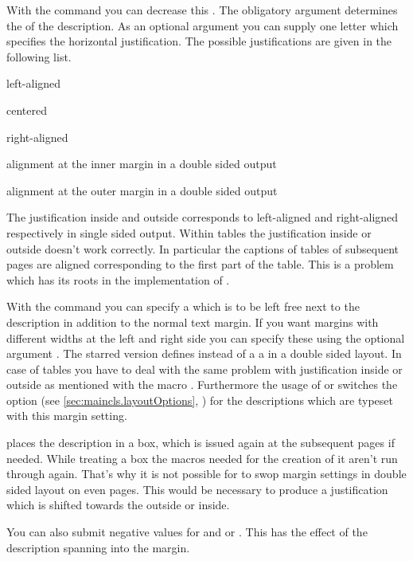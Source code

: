With the command  you can decrease this
.  The obligatory argument determines the  of
the description.  As an optional argument you can supply one letter
which specifies the horizontal justification. The possible
justifications are given in the following list.
\begin{labeling}[--~]{\PValue[o]}
\item[\PValue{l}] left-aligned
\item[\PValue{c}] centered
\item[\PValue{r}] right-aligned
\item[\PValue{i}] alignment at the inner margin in a double sided output
\item[\PValue{o}] alignment at the outer margin in a double sided output
\end{labeling}
The justification inside and outside corresponds to left-aligned and
right-aligned respectively in single sided output. Within
 tables the justification
inside or outside doesn't work correctly. In particular the captions
of tables of subsequent pages are aligned corresponding to the first
part of the table. This is a problem which has its roots in the
implementation of .

With the command  you can specify a 
which is to be left free next to the description in addition to the
normal text margin. If you want margins with different widths at the
left and right side you can specify these using the optional argument
. The starred version  defines
instead of a  a  in a double
sided layout. In case of 
tables you have to deal with the same problem with justification
inside or outside as mentioned with the macro .
Furthermore the usage of  or 
switches the option  (see
\autoref{sec:maincls.layoutOptions},
) for the descriptions which
are typeset with this margin setting.

\begin{Explain}
   places the description in a box, which is issued
  again at the subsequent pages if needed. While treating a box the
  macros needed for the creation of it aren't run through
  again. That's why it is not possible for \KOMAScript{} to swop
  margin settings in double sided layout on even pages. This would be
  necessary to produce a justification which is shifted towards the
  outside or inside.
  
  You can also submit negative values for  and
   or . This has the effect
  of the description spanning into the margin.
\end{Explain}

